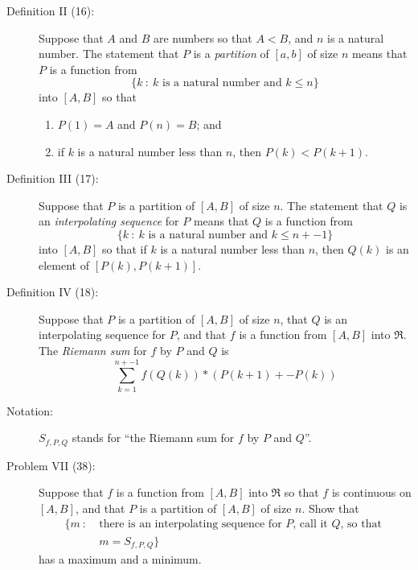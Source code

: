 \documentclass{article}
\begin{document}
\begin{description}
  \item[Definition II (16):] Suppose that $A$ and $B$ are numbers so that $A < B$, and $n$ is a natural number. The statement that $P$ is a \emph{partition} of $[a,b]$ of size $n$ means that $P$ is a function from 
    \begin{equation*}
    \{ k\ :\ k \text{ is a natural number and } k \leq n \}
    \end{equation*}
    into $[A,B]$ so that
    \begin{enumerate}[\hspace{1cm}(i.)]
      \item $P(1) = A$ and $P(n) = B$; and
      \item if $k$ is a natural number less than $n$, then $P(k) < P(k+1)$.
    \end{enumerate}

  \item[Definition III (17):] Suppose that $P$ is a partition of $[A,B]$ of size $n$. The statement that $Q$ is an \emph{interpolating sequence} for $P$ means that $Q$ is a function from 
    \begin{equation*}
    \{ k\ :\ k \text{ is a natural number and } k \leq n + -1 \}
    \end{equation*}
    into $[A,B]$ so that if $k$ is a natural number less than $n$, then $Q(k)$ is an element of $[P(k),P(k+1)]$.

  \item[Definition IV (18):] Suppose that $P$ is a partition of $[A,B]$ of size $n$, that $Q$ is an interpolating sequence for $P$, and that $f$ is a function from $[A,B]$ into $\Re$. The \emph{Riemann sum} for $f$ by $P$ and $Q$ is 
    \begin{equation*}
    \sum_{k=1}^{n + -1} f(Q(k)) * ( P(k+1) + -P(k) )
    \end{equation*}

  \item[Notation:] $S_{f,P,Q}$ stands for ``the Riemann sum for $f$ by $P$ and $Q$''.

  \item[Problem VII (38):] Suppose that $f$ is a function from $[A,B]$ into $\Re$ so that $f$ is continuous on $[A,B]$, and that $P$ is a partition of $[A,B]$ of size $n$. Show that 
    \begin{align*}
    \{ m\ :\ & \text{there is an interpolating sequence for $P$, call it $Q$, so that } \\ 
             & m = S_{f,P,Q} \} 
    \end{align*}
    has a maximum and a minimum.


\end{description}
\end{document}
